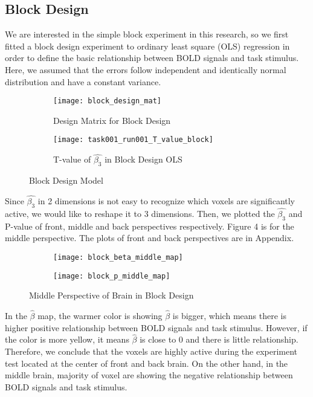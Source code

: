 \subsection{Block Design}

We are interested in the simple block experiment in this research, so we first 
fitted a block design experiment to ordinary least square (OLS) regression in 
order to define the basic relationship between BOLD signals and task 
stimulus. Here, we assumed that the errors follow independent and identically 
normal distribution and have a constant variance.

\begin{figure}[!h]
\centering
\begin{subfigure}{.42\textwidth}
\texttt{[image: block\_design\_mat]}
\centering
\caption{Design Matrix for Block Design\label{fig:blockDM}}
\end{subfigure}%
\begin{subfigure}{.48\textwidth}
\texttt{[image: task001\_run001\_T\_value\_block]}
\centering
\caption{T-value of $\hat{\beta_{3}}$ in Block Design OLS\label{fig:tvalOLS}}
\end{subfigure}
\caption{Block Design Model\label{fig:blockDM}}
\end{figure}

Since $\hat{\beta_{3}}$ in 2 dimensions is not easy to recognize which voxels
are significantly active, we would like to reshape it to 3 dimensions. 
Then, we plotted the $\hat{\beta_{3}}$ and P-value of front, middle and 
back perspectives respectively. Figure 4 is for the middle perspective. The plots
of front and back perspectives are in Appendix.

\begin{figure}[!h]
\centering
\begin{subfigure}{.45\textwidth}
  \texttt{[image: block\_beta\_middle\_map]}
\end{subfigure}%
\begin{subfigure}{.5\textwidth}
  \texttt{[image: block\_p\_middle\_map]}
  \centering
\end{subfigure}
\caption{Middle Perspective of Brain in Block Design\label{fig:mpBrain}}
\end{figure}

In the $\hat{\beta}$ map, the warmer color is showing $\hat{\beta}$ is 
bigger, which means there is higher positive relationship between BOLD signals 
and task stimulus. However, if the color is more yellow, it means 
$\hat{\beta}$ is close to 0 and there is little relationship. Therefore, we conclude 
that the voxels are highly active during the experiment test located at the center 
of front and back brain. On the other hand, in the middle brain, majority of voxel 
are showing the negative relationship between BOLD signals and task stimulus.

